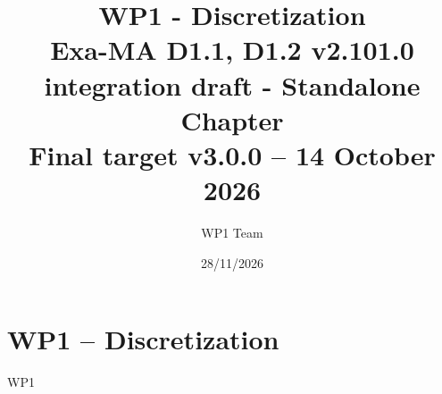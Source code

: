 \documentclass[11pt]{report}
\begin{document}
\title{WP1 - Discretization\\
\large Exa-MA D1.1, D1.2 v2.101.0 integration draft - Standalone Chapter\\
\normalsize Final target v3.0.0 -- 14 October 2026}
\author{WP1 Team}
\date{28/11/2026}
\maketitle

\tableofcontents
\clearpage

\chapter{WP1 -- Discretization}
\label{chap:wp1}
{WP1}
\clearpage


\end{document}
